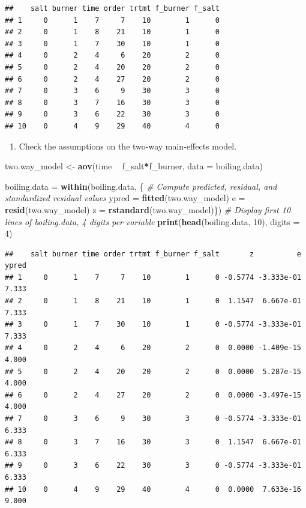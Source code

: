 \documentclass[12pt,]{article}
\newenvironment{Shaded}{\begin{snugshade}}{\end{snugshade}}
\newcommand{\KeywordTok}[1]{\textcolor[rgb]{0.13,0.29,0.53}{\textbf{#1}}}
\newcommand{\DataTypeTok}[1]{\textcolor[rgb]{0.13,0.29,0.53}{#1}}
\newcommand{\DecValTok}[1]{\textcolor[rgb]{0.00,0.00,0.81}{#1}}
\newcommand{\StringTok}[1]{\textcolor[rgb]{0.31,0.60,0.02}{#1}}
\newcommand{\CommentTok}[1]{\textcolor[rgb]{0.56,0.35,0.01}{\textit{#1}}}
\newcommand{\OperatorTok}[1]{\textcolor[rgb]{0.81,0.36,0.00}{\textbf{#1}}}
\newcommand{\NormalTok}[1]{#1}
\providecommand{\tightlist}{%
  \setlength{\itemsep}{0pt}\setlength{\parskip}{0pt}}
\begin{document}
\begin{verbatim}
##    salt burner time order trtmt f_burner f_salt
## 1     0      1    7     7    10        1      0
## 2     0      1    8    21    10        1      0
## 3     0      1    7    30    10        1      0
## 4     0      2    4     6    20        2      0
## 5     0      2    4    20    20        2      0
## 6     0      2    4    27    20        2      0
## 7     0      3    6     9    30        3      0
## 8     0      3    7    16    30        3      0
## 9     0      3    6    22    30        3      0
## 10    0      4    9    29    40        4      0
\end{verbatim}

\begin{enumerate}
\def\labelenumi{(\alph{enumi})}
\tightlist
\item
  Check the assumptions on the two-way main-effects model.
\end{enumerate}

\begin{Shaded}
\begin{Highlighting}[]
\NormalTok{two.way_model <-}\StringTok{ }\KeywordTok{aov}\NormalTok{(time }\OperatorTok{~}\StringTok{ }\NormalTok{f_salt}\OperatorTok{*}\NormalTok{f_burner, }\DataTypeTok{data =}\NormalTok{ boiling.data)}

\NormalTok{boiling.data =}\StringTok{ }\KeywordTok{within}\NormalTok{(boiling.data, \{}
  \CommentTok{# Compute predicted, residual, and standardized residual values}
\NormalTok{  ypred =}\StringTok{ }\KeywordTok{fitted}\NormalTok{(two.way_model)}
\NormalTok{  e =}\StringTok{ }\KeywordTok{resid}\NormalTok{(two.way_model) }
\NormalTok{  z =}\StringTok{ }\KeywordTok{rstandard}\NormalTok{(two.way_model)\})}
\CommentTok{# Display first 10 lines of boiling.data, 4 digits per variable}
\KeywordTok{print}\NormalTok{(}\KeywordTok{head}\NormalTok{(boiling.data, }\DecValTok{10}\NormalTok{), }\DataTypeTok{digits =} \DecValTok{4}\NormalTok{)}
\end{Highlighting}
\end{Shaded}

\begin{verbatim}
##    salt burner time order trtmt f_burner f_salt       z          e ypred
## 1     0      1    7     7    10        1      0 -0.5774 -3.333e-01 7.333
## 2     0      1    8    21    10        1      0  1.1547  6.667e-01 7.333
## 3     0      1    7    30    10        1      0 -0.5774 -3.333e-01 7.333
## 4     0      2    4     6    20        2      0  0.0000 -1.409e-15 4.000
## 5     0      2    4    20    20        2      0  0.0000  5.287e-15 4.000
## 6     0      2    4    27    20        2      0  0.0000 -3.497e-15 4.000
## 7     0      3    6     9    30        3      0 -0.5774 -3.333e-01 6.333
## 8     0      3    7    16    30        3      0  1.1547  6.667e-01 6.333
## 9     0      3    6    22    30        3      0 -0.5774 -3.333e-01 6.333
## 10    0      4    9    29    40        4      0  0.0000  7.633e-16 9.000
\end{verbatim}
\end{document}
